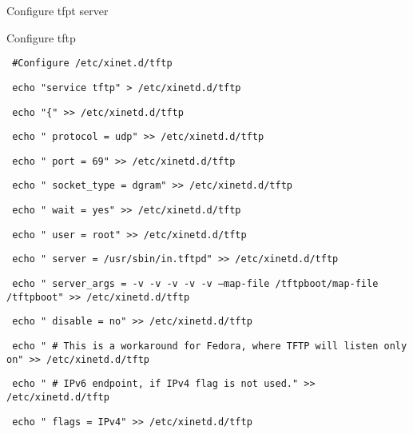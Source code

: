 \documentclass[12pt]{article}
\begin{document}
Configure tfpt server

Configure tftp 

\begin{bash}\texttt{\small{ \#Configure /etc/xinet.d/tftp}}\end{bash}
\begin{bash}\texttt{\small{ echo "service tftp" > /etc/xinetd.d/tftp}}\end{bash}
\begin{bash}\texttt{\small{ echo "\{" >> /etc/xinetd.d/tftp}}\end{bash}
\begin{bash}\texttt{\small{ echo "  protocol        = udp" >> /etc/xinetd.d/tftp}}\end{bash}
\begin{bash}\texttt{\small{ echo "  port            = 69" >> /etc/xinetd.d/tftp}}\end{bash}
\begin{bash}\texttt{\small{ echo "  socket\_type     = dgram" >> /etc/xinetd.d/tftp}}\end{bash}
\begin{bash}\texttt{\small{ echo "  wait            = yes" >> /etc/xinetd.d/tftp}}\end{bash}
\begin{bash}\texttt{\small{ echo "  user            = root" >> /etc/xinetd.d/tftp}}\end{bash}
\begin{bash}\texttt{\small{ echo "  server          = /usr/sbin/in.tftpd" >> /etc/xinetd.d/tftp}}\end{bash}
\begin{bash}\texttt{\small{ echo "  server\_args     = -v -v -v -v -v --map-file /tftpboot/map-file /tftpboot" >> /etc/xinetd.d/tftp}}\end{bash}
\begin{bash}\texttt{\small{ echo "  disable         = no" >> /etc/xinetd.d/tftp}}\end{bash}
\begin{bash}\texttt{\small{ echo "  \# This is a workaround for Fedora, where TFTP will listen only on" >> /etc/xinetd.d/tftp}}\end{bash}
\begin{bash}\texttt{\small{ echo "  \# IPv6 endpoint, if IPv4 flag is not used." >> /etc/xinetd.d/tftp}}\end{bash}
\begin{bash}\texttt{\small{ echo "  flags           = IPv4" >> /etc/xinetd.d/tftp}}\end{bash}
\end{document}
